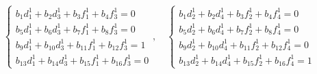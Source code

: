 \begin{equation*}
    \begin{cases}
        b_1 d_1^1 + b_2 d_3^1 + b_3 f_1^1 + b_4 f_3^1 = 0 \\
        b_5 d_1^1 + b_6 d_3^1 + b_7 f_1^1 + b_8 f_3^1 = 0 \\
        b_9 d_1^1 + b_{10} d_3^1 + b_{11} f_1^1 + b_{12} f_3^1 = 1 \\
        b_{13} d_1^1 + b_{14} d_3^1 + b_{15} f_1^1 + b_{16} f_3^1 = 0
    \end{cases}, \quad
    \begin{cases}
        b_1 d_2^1 + b_2 d_4^1 + b_3 f_2^1 + b_4 f_4^1 = 0 \\
        b_5 d_2^1 + b_6 d_4^1 + b_7 f_2^1 + b_8 f_4^1 = 0 \\
        b_9 d_2^1 + b_{10} d_4^1 + b_{11} f_2^1 + b_{12} f_4^1 = 0 \\
        b_{13} d_2^1 + b_{14} d_4^1 + b_{15} f_2^1 + b_{16} f_4^1 = 1
    \end{cases}
\end{equation*}

